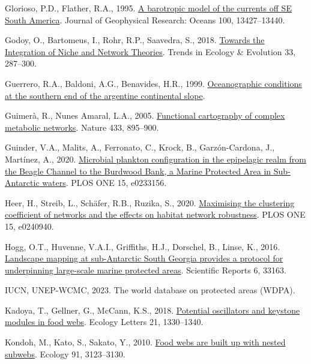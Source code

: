 \documentclass[
]{article}
\newlength{\cslhangindent}
\newenvironment{CSLReferences}[2] %
 {\begin{list}{}{%
  \setlength{\itemindent}{0pt}
  \setlength{\leftmargin}{0pt}
  \setlength{\parsep}{0pt}
  \ifodd #1
   \setlength{\leftmargin}{\cslhangindent}
   \setlength{\itemindent}{-1\cslhangindent}
  \fi
  \setlength{\itemsep}{#2\baselineskip}}}
 {\end{list}}
\begin{document}
\begin{CSLReferences}{1}{0}
Glorioso, P.D., Flather, R.A., 1995.
\href{https://doi.org/10.1029/95JC00942}{A barotropic model of the
currents off {SE South America}}. Journal of Geophysical Research:
Oceans 100, 13427--13440.

Godoy, O., Bartomeus, I., Rohr, R.P., Saavedra, S., 2018.
\href{https://doi.org/10.1016/j.tree.2018.01.007}{Towards the
{Integration} of {Niche} and {Network Theories}}. Trends in Ecology \&
Evolution 33, 287--300.

Guerrero, R.A., Baldoni, A.G., Benavides, H.R., 1999.
\href{http://10.0.64.26/handle/inidep/247}{Oceanographic conditions at
the southern end of the argentine continental slope}.

Guimerà, R., Nunes Amaral, L.A., 2005.
\href{https://doi.org/10.1038/nature03288}{Functional cartography of
complex metabolic networks}. Nature 433, 895--900.

Guinder, V.A., Malits, A., Ferronato, C., Krock, B., Garzón-Cardona, J.,
Martínez, A., 2020.
\href{https://doi.org/10.1371/journal.pone.0233156}{Microbial plankton
configuration in the epipelagic realm from the {Beagle Channel} to the
{Burdwood Bank}, a {Marine Protected Area} in {Sub-Antarctic} waters}.
PLOS ONE 15, e0233156.

Heer, H., Streib, L., Schäfer, R.B., Ruzika, S., 2020.
\href{https://doi.org/10.1371/journal.pone.0240940}{Maximising the
clustering coefficient of networks and the effects on habitat network
robustness}. PLOS ONE 15, e0240940.

Hogg, O.T., Huvenne, V.A.I., Griffiths, H.J., Dorschel, B., Linse, K.,
2016. \href{https://doi.org/10.1038/srep33163}{Landscape mapping at
sub-{Antarctic South Georgia} provides a protocol for underpinning
large-scale marine protected areas}. Scientific Reports 6, 33163.

IUCN, UNEP-WCMC, 2023. The world database on protected areas ({WDPA}).

Kadoya, T., Gellner, G., McCann, K.S., 2018.
\href{https://doi.org/10.1111/ele.13099}{Potential oscillators and
keystone modules in food webs}. Ecology Letters 21, 1330--1340.

Kondoh, M., Kato, S., Sakato, Y., 2010.
\href{https://doi.org/10.1890/09-2219.1}{Food webs are built up with
nested subwebs}. Ecology 91, 3123--3130.


\end{CSLReferences}
\end{document}
